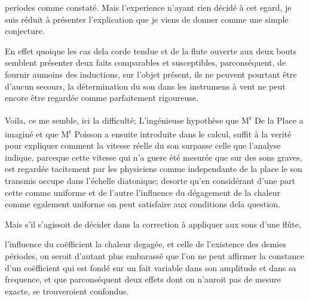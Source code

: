 \documentclass[11pt,a4paper]{article}
\begin{document}

periodes comme constaté. Mais l'experience n'ayant rien décidé à
cet egard, je suis réduit à présenter l'explication que je viens
de donner comme une simple conjecture.

En effet quoique les cas dela corde tendue et de la flute
ouverte aux deux bouts semblent présenter deux faits
comparables et susceptibles, parconséquent, de fournir aumoins
des inductions,  sur l'objet présent, ils ne peuvent
pourtant être d'aucun secours,   la détermination
du son dans les instrumens à vent ne peut encore être
regardée comme parfaitement rigoureuse.

Voila, ce me semble, ici la difficulté; L'ingénieuse hypothèse
que M\textsuperscript{r} De la Place a imaginé et que M\textsuperscript{r} Poisson
a ensuite introduite dans le calcul, suffit à la verité
pour expliquer comment la vitesse réelle du son surpasse
celle que l'analyse indique, parceque cette vitesse qui n'a
guere été mesurée que sur des sons graves, est regardée
 tacitement par les physiciens comme independante de
la place   le son transmis occupe dans
l'échelle diatonique; desorte qu'en considérant d'une part
cette   comme uniforme et de l'autre l'influence
du dégagement de la chaleur comme egalement uniforme
on peut satisfaire aux conditions dela question.

Mais s'il s'agissoit de décider dans la correction à
appliquer aux sons d'une flûte, 


l'influence du coëfficient   la chaleur degagée, et celle de l'existence
des demies périodes, on seroit d'autant plus embarassé que
l'on ne  peut affirmer la constance d'un
coëfficient qui est fondé sur un fait variable dans son
amplitude et dans sa frequence,  et que parconséquent
deux effets dont on n'auroit pas de mesure exacte, se
trouveroient confondus.
\end{document}
